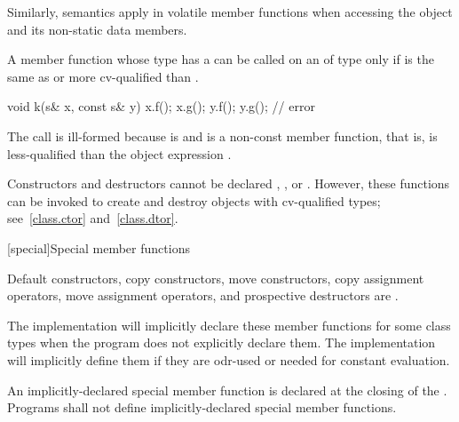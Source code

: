 \pnum
\begin{note}
Similarly,  semantics apply in
volatile member functions when accessing the object and its
non-static data members.
\end{note}

\pnum
A member function whose type has a  
can be called on an
 of type   only
if  is the same as or more cv-qualified than .
\begin{example}
\begin{codeblock}
void k(s& x, const s& y) {
  x.f();
  x.g();
  y.f();
  y.g();                        // error
}
\end{codeblock}

The call  is ill-formed because  is 
and  is a non-const member function, that is,
 is less-qualified than the object expression .
\end{example}

\pnum
{}%
%
%
%
\begin{note}
Constructors and destructors
cannot be declared , , or 
.
However, these functions can be invoked
to create and destroy objects with cv-qualified types;
see~\ref{class.ctor} and~\ref{class.dtor}.
\end{note}

[special]{Special member functions}

%
%
%
%

\pnum
{}%
%
%
%
%
Default constructors,
copy constructors, move constructors,
copy assignment operators, move assignment operators,
and prospective destructors are
.
\begin{note}
The implementation will implicitly declare these member functions for some class
types when the program does not explicitly declare them.
The implementation will implicitly define them
if they are odr-used or
needed for constant evaluation.
\end{note}
An implicitly-declared special member function is declared at the closing
\tcode{\}} of the .
Programs shall not define implicitly-declared special member functions.

